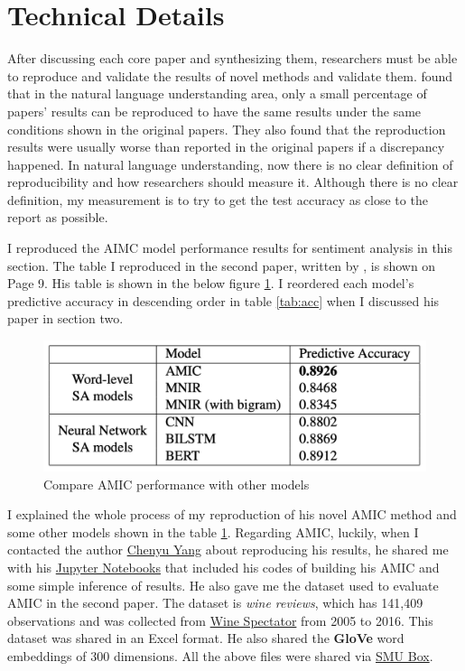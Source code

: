 \documentclass[aoas]{imsart}
\numberwithin{equation}{section}
\theoremstyle{plain}
\theoremstyle{remark}
\begin{document}
\section{Technical Details}
After discussing each core paper and synthesizing them, researchers must be able to reproduce and validate the results of novel methods and validate them. \cite{belz-etal-2021-systematic} found that in the natural language understanding area, only a small percentage of papers' results can be reproduced to have the same results under the same conditions shown in the original papers. They also found that the reproduction results were usually worse than reported in the original papers if a discrepancy happened. In natural language understanding, now there is no clear definition of reproducibility and how researchers should measure it. Although there is no clear definition, my measurement is to try to get the test accuracy as close to the report as possible.  

I reproduced the AIMC model performance results for sentiment analysis in this section. The table I reproduced in the second paper, written by \cite{chenyu}, is shown on Page 9. His table is shown in the below figure \ref{Fig11: per}. I reordered each model's predictive accuracy in descending order in table \ref{tab:acc} when I discussed his paper in section two. 
\begin{figure}[ht]
\includegraphics[scale=0.4]{img/per.png}
\caption{Compare AMIC performance with other models}
\label{Fig11: per}
\end{figure}

I explained the whole process of my reproduction of his novel AMIC method and some other models shown in the table \ref{Fig11: per}. Regarding AMIC, luckily, when I contacted the author \href{chenyuy@smu.edu}{Chenyu Yang} about reproducing his results, he shared me with his \href{https://jupyter.org/}{Jupyter Notebooks} that included his codes of building his AMIC and some simple inference of results. He also gave me the dataset used to evaluate AMIC in the second paper. The dataset is \textit{wine reviews}, which has 141,409 observations and was collected from \href{https://www.winespectator.com/}{Wine Spectator} from 2005 to 2016. This dataset was shared in an Excel format. He also shared the \textbf{GloVe} word embeddings of 300 dimensions. All the above files were shared via \href{https://www.smu.edu/OIT/Services/Box}{SMU Box}.
\end{document}
